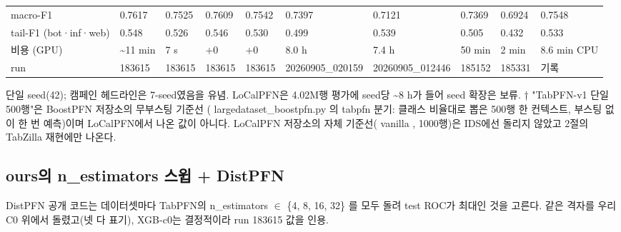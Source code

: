 \begin{landscape}
\begin{longtable}
{}macro-F1 & 0.7617 & 0.7525 & 0.7609 & 0.7542 & 0.7397 & 0.7121 & 0.7369 & 0.6924 & 0.7548 \\
{}tail-F1 (bot·inf·web) & 0.548 & 0.526 & 0.546 & 0.530 & 0.499 & 0.539 & 0.505 & 0.432 & 0.533 \\
{}비용 (GPU) & \textasciitilde{}11 min & 7 s & +\allowbreak{}0 & +\allowbreak{}0 & 8.0 h & 7.4 h & 50 min & 2 min & 8.6 min CPU \\
{}run & 183615 & 183615 & 183615 & 183615 & 20260905\_\allowbreak{}020159 & 20260905\_\allowbreak{}012446 & 185152 & 185331 & 기록 \\
\bottomrule
\end{longtable}
\endgroup
\end{landscape}
단일 seed(42); 캠페인 헤드라인은 7-seed였음을 유념. LoCalPFN은 4.02M행 평가에 seed당 \textasciitilde{}8 h가 들어 seed 확장은 보류. † "TabPFN-v1 단일 500행"은 BoostPFN 저장소의 무부스팅 기준선 ( largedataset\_\allowbreak{}boostpfn.py 의 tabpfn 분기: 클래스 비율대로 뽑은 500행 한 컨텍스트, 부스팅 없이 한 번 예측)이며 LoCalPFN에서 나온 값이 아니다. LoCalPFN 저장소의 자체 기준선( vanilla , 1000행)은 IDS에선 돌리지 않았고 2절의 TabZilla 재현에만 나온다.

\subsection*{ours의 n\_\allowbreak{}estimators 스윕 +\allowbreak{} DistPFN}
DistPFN 공개 코드는 데이터셋마다 TabPFN의 n\_\allowbreak{}estimators \ensuremath{\in} \{4, 8, 16, 32\} 를 모두 돌려 test ROC가 최대인 것을 고른다. 같은 격자를 우리 C0 위에서 돌렸고(넷 다 표기), XGB-c0는 결정적이라 run 183615 값을 인용.

